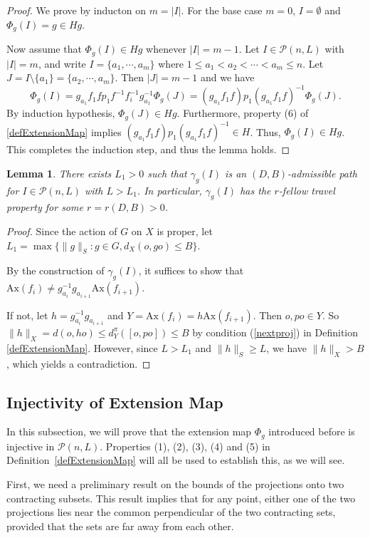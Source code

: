 \documentclass{amsart}
\numberwithin{thm}{section}
\numberwithin{figure}{section}
\newtheorem{lem}[thm]{Lemma}
\theoremstyle{definition}
\theoremstyle{definition}
\theoremstyle{remark}
\newcommand{\ax}{\mathrm{Ax}}
\numberwithin{equation}{section}
\theoremstyle{plain}
\begin{document}
\begin{proof}
    We prove by inducton on $m=|I|$. For the base case $m=0$, $I=\emptyset$ and $\Phi_g(I) = g\in Hg$.
    
    Now assume that $\Phi_g(I)\in Hg$ whenever $|I|=m-1$. Let $I\in\mathcal{P}(n, L)$ with $|I|=m$, and write $I = \{a_1,\cdots, a_m\}$ where $1\le a_1<a_2<\cdots<a_m\le n$. Let $J = I\setminus\{a_1\} = \{a_2, \cdots, a_m\}$. Then $|J|=m-1$ and we have $$\Phi_g(I) = g_{a_1} f_1 f p_1 f^{-1} f_i^{-1}g_{a_1}^{-1}\Phi_g(J) = (g_{a_1}f_1 f) p_1 (g_{a_1}f_1 f)^{-1} \Phi_g(J).$$ By induction hypothesis, $\Phi_g(J)\in Hg$. Furthermore, property (6) of \ref{defExtensionMap} implies $(g_{a_1}f_1 f) p_1 (g_{a_1}f_1 f)^{-1}\in H$. Thus, $\Phi_g(I)\in Hg$. This completes the induction step, and thus the lemma holds.
\end{proof}
\begin{lem}\label{extAdm}
	There exists $L_1>0$ such that $\gamma_g(I)$ is an $(D, B)$-admissible path for $I\in \mathcal{P}(n, L)$ with $L>L_1$. In particular, $\gamma_g(I)$ has the $r$-fellow travel property for some $r = r(D, B) > 0$.
\end{lem}
\begin{proof}
    Since the action of $G$ on $X$ is proper, let $L_1 = \max\{\|g\|_S: g\in G, d_X(o, go) \le B\}$.
    
	By the construction of $\gamma_g(I)$, it suffices to show that $\ax(f_i) \neq g_{a_{i}}^{-1} g_{a_{i+1}} \ax(f_{i+1})$.  
	
	If not, let $h = g_{a_{i}}^{-1} g_{a_{i+1}}$ and $Y = \ax(f_i) = h \ax(f_{i+1})$. Then $o, po\in Y$. So $\|h\|_X = d(o, h o) \le d^{\pi}_Y([o, po]) \le B$ by condition (\ref{nextproj}) in Definition \ref{defExtensionMap}. However, since $L>L_1$ and $\|h\|_S \ge L$, we have $\|h\|_X  > B$, which yields a contradiction.
\end{proof}

\subsection{Injectivity of Extension Map}
\label{subsec:injectivity}
In this subsection, we will prove that the extension map $\Phi_g$ introduced before is injective in $\mathcal{P}(n, L)$. Properties (1), (2), (3), (4) and (5) in Definition~\ref{defExtensionMap} will all be used to establish this, as we will see.

First, we need a preliminary result on the bounds of the projections onto two contracting subsets. This result implies that for any point, either one of the two projections lies near the common perpendicular of the two contracting sets, provided that the sets are far away from each other.
\end{document}
